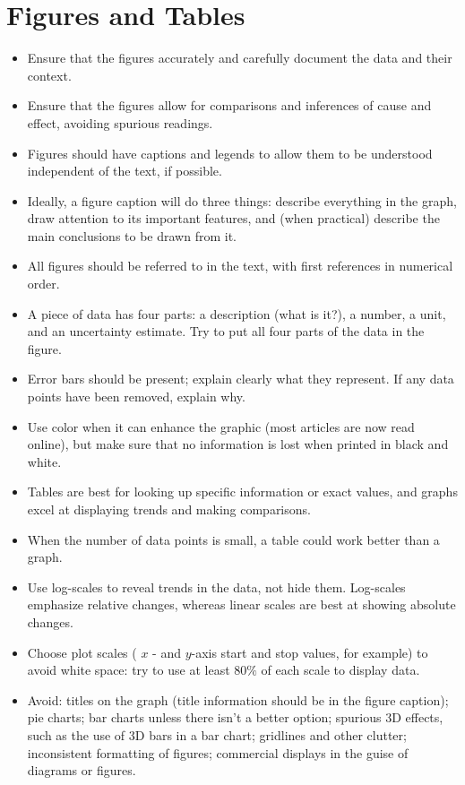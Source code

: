 \section*{Figures and Tables}
\begin{itemize}
  \item Ensure that the figures accurately and carefully document the data and their context.
  \item Ensure that the figures allow for comparisons and inferences of cause and effect, avoiding spurious readings.
  \item Figures should have captions and legends to allow them to be understood independent of the text, if possible.
  \item Ideally, a figure caption will do three things: describe everything in the graph, draw attention to its important features, and (when practical) describe the main conclusions to be drawn from it.
  \item All figures should be referred to in the text, with first references in numerical order.
  \item A piece of data has four parts: a description (what is it?), a number, a unit, and an uncertainty estimate. Try to put all four parts of the data in the figure.
  \item Error bars should be present; explain clearly what they represent. If any data points have been removed, explain why.
  \item Use color when it can enhance the graphic (most articles are now read online), but make sure that no information is lost when printed in black and white.
  \item Tables are best for looking up specific information or exact values, and graphs excel at displaying trends and making comparisons.
  \item When the number of data points is small, a table could work better than a graph.
  \item Use log-scales to reveal trends in the data, not hide them. Log-scales emphasize relative changes, whereas linear scales are best at showing absolute changes.
  \item Choose plot scales ( $x$ - and $y$-axis start and stop values, for example) to avoid white space: try to use at least $80 \%$ of each scale to display data.
  \item Avoid: titles on the graph (title information should be in the figure caption); pie charts; bar charts unless there isn't a better option; spurious 3D effects, such as the use of 3D bars in a bar chart; gridlines and other clutter; inconsistent formatting of figures; commercial displays in the guise of diagrams or figures.
\end{itemize}

